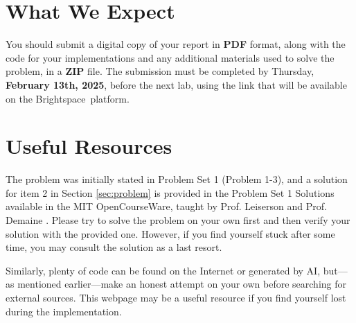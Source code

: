 \documentclass[11pt]{article}
\begin{document}
\section{What We Expect}
You should submit a digital copy of your report in \textbf{PDF} format, along with the code for your implementations and any additional materials used to solve the problem, in a \textbf{ZIP} file. The submission must be completed by Thursday, \textbf{February 13th, 2025}, before the next lab, using the link that will be available on the Brightspace\texttrademark\ platform.


\section{Useful Resources}
The problem was initially stated in Problem Set 1 (Problem 1-3), and a solution for item 2 in Section \ref{sec:problem} is provided in the Problem Set 1 Solutions available in the MIT OpenCourseWare, taught by Prof. Leiserson and Prof. Demaine \cite{leiserson1:2005, leiserson2:2005}. Please try to solve the problem on your own first and then verify your solution with the provided one. However, if you find yourself stuck after some time, you may consult the solution as a last resort.

Similarly, plenty of code can be found on the Internet or generated by AI, but—as mentioned earlier—make an honest attempt on your own before searching for external sources. This webpage \cite{gfg:2023} may be a useful resource if you find yourself lost during the implementation.




\end{document}

